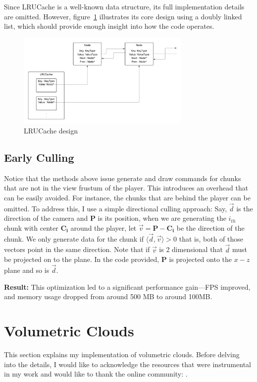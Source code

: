 Since LRUCache is a well-known data structure, its full implementation details are omitted. However, figure~\ref{fig:lru_cache} illustrates its core design using a doubly linked list, which should provide enough insight into how the code operates.

\begin{figure}[H]
    \centering
    \includegraphics[width=0.75\textwidth]{images/lru_cache.png}
    \caption{LRUCache design}
    \label{fig:lru_cache}
\end{figure}

\subsection{Early Culling}
Notice that the methods above issue generate and draw commands for chunks that are not in the view frustum of the player. This introduces an overhead that can be easily avoided. For instance, the chunks that are behind the player can be omitted. To address this, I use a simple directional culling approach: Say, $\vec{d}$ is the direction of the camera and $\mathbf{P}$ is its position, when we are generating the $i_{th}$ chunk with center $\mathbf{C_i}$ around the player, let $\vec{v} = \mathbf{P}-\mathbf{C_i}$ be the direction of the chunk. We only generate data for the chunk if $\langle \vec{d}, \vec{v} \rangle > 0$ that is, both of those vectors point in the same direction. Note that if $\vec{v}$ is 2 dimensional that $\vec{d}$ must be projected on to the plane. In the code provided, $\mathbf{P}$ is projected onto the $x-z$ plane and so is $\vec{d}$.

\textbf{Result:} This optimization led to a significant performance gain—FPS improved, and memory usage dropped from around 500 MB to around 100MB.


\section{Volumetric Clouds}
This section explains my implementation of volumetric clouds. Before delving into the details, I would like to acknowledge the resources that were instrumental in my work and would like to thank the online community: \cite{sebestianlague2019} \cite{shadertoy2013} \cite{guerrillagames2025nubis} \cite{reinder2018} \cite{fredrik} \cite{gamedevnet2015horizonzerodawn} \cite{palenik2016volumetricclouds} \cite{maxime2023} \cite{engel2016gpupro7}.
